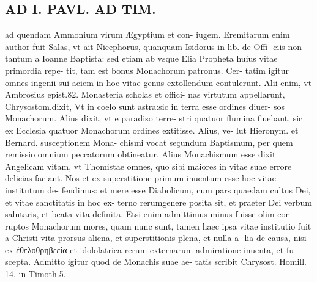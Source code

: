 \documentclass{article}
\begin{document}
\begin{pages}
\section*{AD I. PAVL. AD TIM. }
\marginpar{[ p.216 ]}\pstart ad quendam Ammonium virum Ægyptium et con- iugem. Eremitarum enim author fuit Salas, vt ait Nicephorus, quanquam Isidorus in lib.  de Offi- ciis non tantum a Ioanne Baptista: sed etiam ab vsque Elia Propheta huius vitae primordia repe- tit, tam est bonus Monachorum patronus. Cer- tatim igitur omnes ingenii sui aciem in hoc vitae genus extollendum contulerunt. Alii enim, vt Ambrosius epist.82. Monasteria scholas et offici- nas virtutum appellarunt, Chrysostom.dixit, Vt in coelo sunt astra:sic in terra esse ordines diuer- sos Monachorum. Alius dixit, vt e paradiso terre- stri quatuor flumina fluebant, sic ex Ecclesia quatuor Monachorum ordines extitisse. Alius, ve- lut Hieronym. et Bernard. susceptionem Mona- chismi vocat seçundum Baptismum, per quem remissio omnium peccatorum obtineatur. Alius Monachismum esse dixit Angelicam vitam, vt Thomistae omnes, quo sibi maiores in vitae suae errore delicias faciant. Nos et ex superstitione primum inuentum esse hoc vitae institutum de- fendimus: et mere esse Diabolicum, cum pars quaedam cultus Dei, et vitae sanctitatis in hoc ex- terno rerumgenere posita sit, et praeter Dei verbum salutaris, et beata vita definita. Etsi enim admittimus minus fuisse olim cor- ruptos Monachorum mores, quam nunc sunt, tamen haec ipsa vitae institutio fuit a Christi vita prorsus aliena, et superstitionis plena, et nulla a- lia de causa, nisi ex ἐθελοθρηβεεία et idololatrica rerum externarum admiratione inuenta, et fu- scepta. Admitto igitur quod de Monachis suae ae- tatis scribit Chrysost. Homill. 14. in Timoth.5.  \pend

\end{pages}
\end{document}

